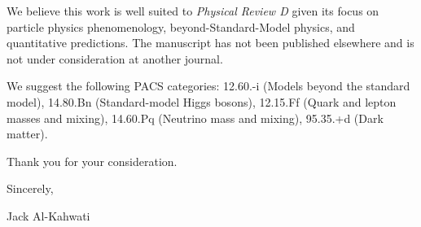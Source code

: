 \documentclass[11pt]{article}
\begin{document}
We believe this work is well suited to \textit{Physical Review D} given its focus on particle physics phenomenology, beyond-Standard-Model physics, and quantitative predictions. The manuscript has not been published elsewhere and is not under consideration at another journal.

We suggest the following PACS categories: 12.60.-i (Models beyond the standard model), 14.80.Bn (Standard-model Higgs bosons), 12.15.Ff (Quark and lepton masses and mixing), 14.60.Pq (Neutrino mass and mixing), 95.35.+d (Dark matter).

Thank you for your consideration.

\vspace{1em}
Sincerely,

\vspace{1em}
Jack Al-Kahwati
\end{document}
